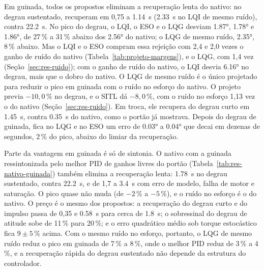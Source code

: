 Em guinada, todos os propostos eliminam a recuperação lenta do nativo: no
degrau sustentado, recuperam em 0,75 a \SI{1.14}{\second}
(\SI{2.33}{\second} no LQI de mesmo ruído), contra \SI{22.2}{\second}. No
pico do degrau, o LQI, o ESO e o LQG desviam \ang{1.87}, \ang{1.78} e
\ang{1.86}, de 27\,\% a 31\,\% abaixo dos \ang{2.56} do nativo; o LQG de
mesmo ruído, \ang{2.35}, 8\,\% abaixo. Mas o LQI e o ESO compram essa
rejeição com 2,4 e 2,0 vezes o ganho de ruído do nativo
(Tabela~\ref{tab:projeto-margens}), e o LQG, com 1,4 vez
(Seção~\ref{sec:res-ruido}); com o ganho de ruído do nativo, o LQI desvia
\ang{6.16} no degrau, mais que o dobro do nativo. O LQG de mesmo ruído é o
único projetado para reduzir o pico em guinada com o ruído no esforço do
nativo. O projeto previa $-10{,}0$\,\% no degrau, e o SITL dá $-8{,}0$\,\%,
com o ruído no esforço 1,13 vez o do nativo (Seção~\ref{sec:res-ruido}). Em
troca, ele recupera do degrau curto em \SI{1.45}{\second}, contra
\SI{0.35}{\second} do nativo, como o portão já mostrava. Depois do degrau
de guinada, fica no LQG e no ESO um erro de \ang{0.03} a \ang{0.04} que
decai em dezenas de segundos, 2\,\% do pico, abaixo do limiar da
recuperação.

\begin{table}[htbp]
\centering
\caption{Linha de base de guinada: o nativo com os ganhos do AutoTune e com
a guinada ressintonizada pelo melhor PID de ganhos livres do portão.}
\label{tab:res-nativo-guinada}
\small


\nota{\raggedright }
\end{table}

Parte da vantagem em guinada é só de sintonia. O nativo com a guinada
ressintonizada pelo melhor PID de ganhos livres do portão
(Tabela~\ref{tab:res-nativo-guinada}) também elimina a recuperação lenta:
\SI{1.78}{\second} no degrau sustentado, contra \SI{22.2}{\second}, e de
1,7 a \SI{3.4}{\second} com erro de modelo, falha de motor e saturação. O
pico quase não muda (de $-2$\,\% a $-5$\,\%), e o ruído no esforço é o do
nativo. O preço é o mesmo dos propostos: a recuperação do degrau curto e do
impulso passa de 0,35 e \SI{0.58}{\second} para cerca de
\SI{1.8}{\second}; o sobressinal do degrau de atitude sobe de 11\,\% para
20\,\%; e o erro quadrático médio sob torque estocástico fica
$9 \pm 5$\,\% acima. Com o mesmo ruído no esforço, portanto, o LQG de mesmo
ruído reduz o pico em guinada de 7\,\% a 8\,\%, onde o melhor PID reduz de
3\,\% a 4\,\%, e a recuperação rápida do degrau sustentado não depende da
estrutura do controlador.

